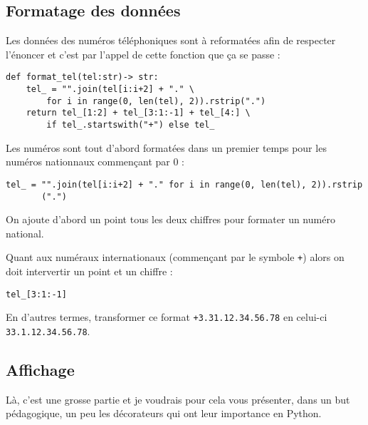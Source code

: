 \documentclass[a4paper,12pt]{article}
\begin{document}
\subsection*{Formatage des données}
Les données des numéros téléphoniques sont à reformatées afin de respecter l'énoncer et c'est par l'appel de cette fonction que ça se passe :
\begin{lstlisting}
def format_tel(tel:str)-> str:
    tel_ = "".join(tel[i:i+2] + "." \
     	for i in range(0, len(tel), 2)).rstrip(".")
    return tel_[1:2] + tel_[3:1:-1] + tel_[4:] \
    	if tel_.startswith("+") else tel_
\end{lstlisting}
\medskip

Les numéros sont tout d'abord formatées dans un premier temps pour les numéros nationnaux commençant par 0 :
\begin{verbatim}
tel_ = "".join(tel[i:i+2] + "." for i in range(0, len(tel), 2)).rstrip
       (".")
\end{verbatim}
\medskip

On ajoute d'abord un point tous les deux chiffres pour formater un numéro national.
\medskip

Quant aux numéraux internationaux (commençant par le symbole \og \texttt{+}\fg{}) alors on doit intervertir un point et un chiffre : 
\begin{verbatim}
tel_[3:1:-1]
\end{verbatim}
En d'autres termes, transformer ce format \texttt{+3.31.12.34.56.78} en celui-ci \\
\texttt{33.1.12.34.56.78}.
\medskip

\subsection*{Affichage}
Là, c'est une grosse partie et je voudrais pour cela vous présenter, dans un but pédagogique, un peu les décorateurs qui ont leur importance en Python.
\medskip
\end{document}
